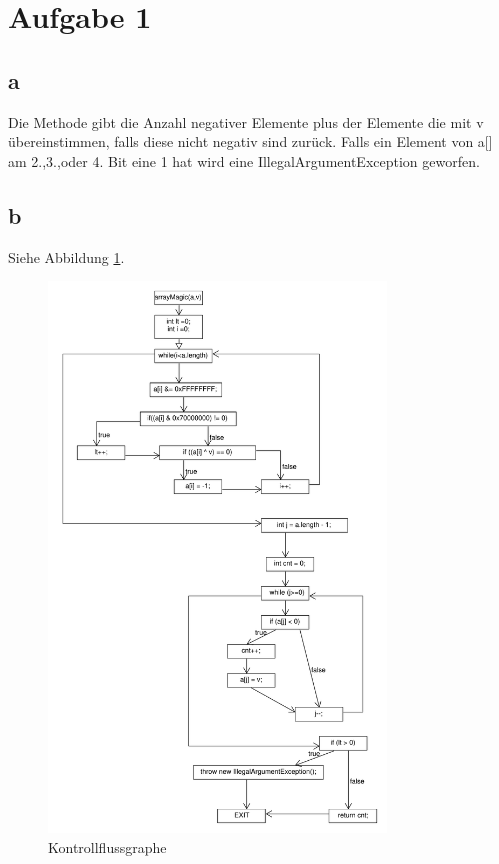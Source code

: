 \chapter*{Aufgabe 1}
\section*{a}
Die Methode gibt die Anzahl negativer Elemente plus der Elemente die mit v übereinstimmen, falls diese nicht negativ sind zurück. Falls ein Element von a[] am 2.,3.,oder 4. Bit eine 1 hat wird eine IllegalArgumentException geworfen.

\section*{b}
Siehe Abbildung \ref{fig:flowChart}.
\begin{figure}[h]
	\centering
	\includegraphics[width=0.8\textwidth, clip]{FlowChart.pdf}
	\caption{Kontrollflussgraphe}
	\label{fig:flowChart}
\end{figure}
